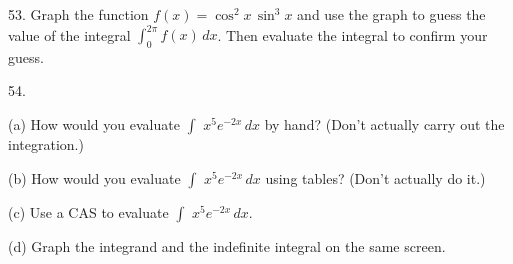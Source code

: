 \documentclass{sebase}
\begin{document}
\begin{multicols}{2}
\begin{ExerciseList}
\item[\hfill 53.] 
\GCALCX%
Graph the function $f(x)=\cos ^{2}x\,\sin ^{3}x$ and use the graph to guess
the value of the integral $\int_{0}^{2\pi }f(x)\,dx$. Then evaluate the
integral to confirm your guess.

%

%

\item[\hfill 54.] 

\begin{ExerciseList}
\item[(a)] 
\CASXT%
How would you evaluate $\int \,\,x^{5}e^{-2x}\,dx$ by hand? \newline
(Don't actually carry out the integration.)

%

\item[(b)] How would you evaluate $\int \,\,x^{5}e^{-2x}\,dx$ using tables? 
\newline
(Don't actually do it.)

%

\item[(c)] Use a CAS to evaluate $\int \,\,x^{5}e^{-2x}\,dx$.

%

\item[(d)] Graph the integrand and the indefinite integral on the same
screen.


\end{ExerciseList}
\end{ExerciseList}
\end{multicols}
\end{document}
